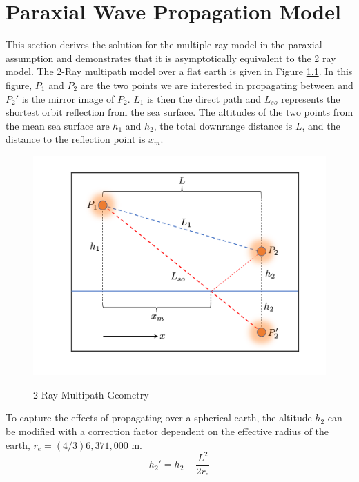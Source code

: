 \chapter{Paraxial Wave Propagation Model}
\label{analytical_propagation}

This section derives the solution for the multiple ray model in the paraxial assumption and demonstrates that it is asymptotically equivalent to the 2 ray model. The 2-Ray multipath model over a flat earth is given in Figure \ref{mp_fig:1}. In this figure, $P_1$ and $P_2$ are the two points we are interested in propagating between and $P_2'$ is the mirror image of $P_2$. $L_1$ is then the direct path and $L_{so}$ represents the shortest orbit reflection from the sea surface. The altitudes of the two points from the mean sea surface are $h_1$ and $h_2$, the total downrange distance is $L$, and the distance to the reflection point is $x_m$.

\begin{figure}[H]
  \begin{center}
\includegraphics[width=5in]{../media/analysis/multipath_2_ray.png}
  \end{center}
  \renewcommand{\baselinestretch}{1} \small\normalsize
  \begin{quote}
    \caption[2 Ray Multipath Geometry]{ 2 Ray Multipath Geometry\label{mp_fig:1}}
  \end{quote}
\end{figure}
\renewcommand{\baselinestretch}{2} \small\normalsize

To capture the effects of propagating over a spherical earth, the altitude $h_2$ can be modified with a correction factor \cite{blake_radar} dependent on the effective radius of the earth, $r_e = (4/3) 6,371,000$ m.
\begin{equation}
h_2' = h_2 - \frac{L^2}{2r_e}
\label{mp_eq:0}
\end{equation}

